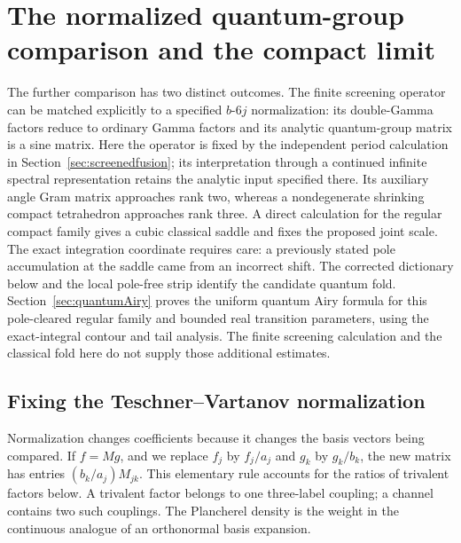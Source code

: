 \section{The normalized quantum-group comparison and the compact limit}
\label{sec:normalizedsixj}

The further comparison has two distinct outcomes. The finite
screening operator can be matched explicitly to a specified
$b$-$6j$ normalization: its double-Gamma factors reduce to
ordinary Gamma factors and its analytic quantum-group matrix
is a sine matrix. Here the operator is fixed by the independent
period calculation in Section~\ref{sec:screenedfusion}; its
interpretation through a continued infinite spectral representation
retains the analytic input specified there. Its auxiliary angle Gram matrix
approaches rank two, whereas a nondegenerate shrinking compact
tetrahedron approaches rank three. A direct calculation for
the regular compact family gives a cubic classical saddle
and fixes the proposed joint scale. The exact integration coordinate
requires care: a previously stated pole accumulation at the saddle
came from an incorrect shift. The corrected dictionary below and
the local pole-free strip identify the candidate quantum fold.
Section~\ref{sec:quantumAiry} proves the uniform quantum Airy formula
for this pole-cleared regular family and bounded real transition
parameters, using the exact-integral contour and tail analysis.
The finite screening calculation and the classical fold here do not
supply those additional estimates.

\subsection{Fixing the Teschner--Vartanov normalization}

Normalization changes coefficients because it changes the basis
vectors being compared. If $f=M g$, and we replace $f_j$ by
$f_j/a_j$ and $g_k$ by $g_k/b_k$, the new matrix has entries
$(b_k/a_j)M_{jk}$. This elementary rule accounts for the ratios
of trivalent factors below. A trivalent factor belongs to one
three-label coupling; a channel contains two such couplings.
The Plancherel density is the weight in the continuous analogue
of an orthonormal basis expansion.

